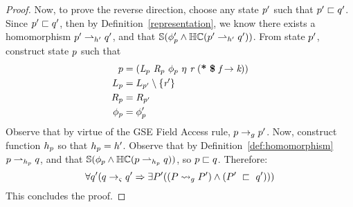 \begin{proof}
Now, to prove the reverse direction, choose any state $p^\prime$ such that $p^\prime \sqsubset q^\prime$. Since $p^\prime \sqsubset q^\prime$, then by Definition~\ref{representation}, we know there exists a homomorphism $p^\prime \rightharpoonup_{h^\prime} q^\prime$, and that $\mathbb{S}( \phi_{p}^\prime \wedge \mathbb{HC}(p^\prime \rightharpoonup_{h^\prime} q^\prime) )$. From state $p^\prime$, construct state $p$ such that 
\begin{align*}
\gsest &= \lp \cfgnt{L}_\gsest\ \cfgnt{R}_\gsest\ \phi_\gsest\ \eta\ \cfgnt{r}\ \lp \cfgt{*}\ \cfgt{\$}\ \cfgnt{f} \rightarrow \cfgnt{k}\rp \rp\\
L_\gsest &= L_{\gsest^\prime} \setminus \{\cfgnt{r}^\prime \}\\
R_\gsest &= R_{\gsest^\prime}\\
\phi_\gsest &= \phi_\gsest^\prime
\end{align*}
Observe that by virtue of the GSE Field Access rule, $p \rightarrow_{g} p^\prime$. Now, construct function $h_{p}$ so that $h_{p} = h^\prime$. Observe that by Definition~\ref{def:homomorphism} $p \rightharpoonup_{h_{p}} q$,  and that $\mathbb{S}( \phi_{p} \wedge \mathbb{HC}(p \rightharpoonup_{h_{p}} q) )$, so $p \sqsubset q$. Therefore:
\begin{equation}
\forall q^\prime ( q \rightarrow_{\varsigma} q^\prime\Rightarrow \exists P^\prime( (P \leadsto_{g} P^\prime )\wedge (P^\prime\ \sqsubset\ q^\prime ))  )
\end{equation}
 This concludes the proof.
\end{proof}


